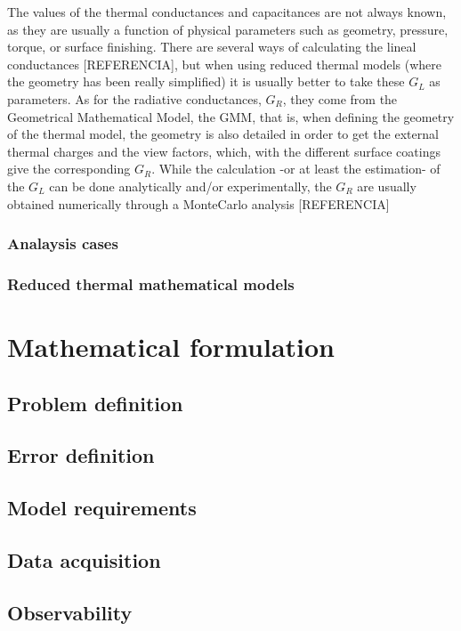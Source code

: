 The values of the thermal conductances and capacitances are not always known, as they are usually a function of physical parameters such as geometry, pressure, torque, or surface finishing. There are several ways of calculating the lineal conductances [REFERENCIA], but when using reduced thermal models (where the geometry has been really simplified) it is usually better to take these $G_L$ as parameters. As for the radiative conductances, $G_R$, they come from the Geometrical Mathematical Model, the GMM, that is, when defining the geometry of the thermal model, the geometry is also detailed in order to get the external thermal charges and the view factors, which, with the different surface coatings give the corresponding $G_R$. While the calculation -or at least the estimation- of the $G_L$ can be done analytically and/or experimentally, the $G_R$ are usually obtained numerically through a MonteCarlo analysis [REFERENCIA] 



\subsection{Analaysis cases}
\subsection{Reduced thermal mathematical models}

\chapter{Mathematical formulation}
\section{Problem definition}
\section{Error definition}
\section{Model requirements}
\section{Data acquisition}
\section{Observability}
